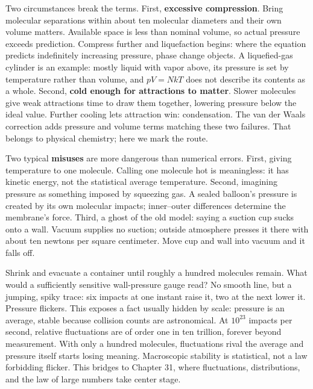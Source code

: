 Two circumstances break the terms. First, \textbf{excessive compression}. Bring molecular separations within about ten molecular diameters and their own volume matters. Available space is less than nominal volume, so actual pressure exceeds prediction. Compress further and liquefaction begins: where the equation predicts indefinitely increasing pressure, phase change objects. A liquefied-gas cylinder is an example: mostly liquid with vapor above, its pressure is set by temperature rather than volume, and \(pV=NkT\) does not describe its contents as a whole. Second, \textbf{cold enough for attractions to matter}. Slower molecules give weak attractions time to draw them together, lowering pressure below the ideal value. Further cooling lets attraction win: condensation. The van der Waals correction adds pressure and volume terms matching these two failures. That belongs to physical chemistry; here we mark the route.

Two typical \textbf{misuses} are more dangerous than numerical errors. First, giving temperature to one molecule. Calling one molecule hot is meaningless: it has kinetic energy, not the statistical average temperature. Second, imagining pressure as something imposed by squeezing gas. A sealed balloon's pressure is created by its own molecular impacts; inner--outer differences determine the membrane's force. Third, a ghost of the old model: saying a suction cup sucks onto a wall. Vacuum supplies no suction; outside atmosphere presses it there with about ten newtons per square centimeter. Move cup and wall into vacuum and it falls off.

\begin{thought}
Shrink and evacuate a container until roughly a hundred molecules remain. What would a sufficiently sensitive wall-pressure gauge read? No smooth line, but a jumping, spiky trace: six impacts at one instant raise it, two at the next lower it. Pressure flickers. This exposes a fact usually hidden by scale: pressure is an average, stable because collision counts are astronomical. At \(10^{23}\) impacts per second, relative fluctuations are of order one in ten trillion, forever beyond measurement. With only a hundred molecules, fluctuations rival the average and pressure itself starts losing meaning. Macroscopic stability is statistical, not a law forbidding flicker. This bridges to Chapter 31, where fluctuations, distributions, and the law of large numbers take center stage.
\end{thought}

